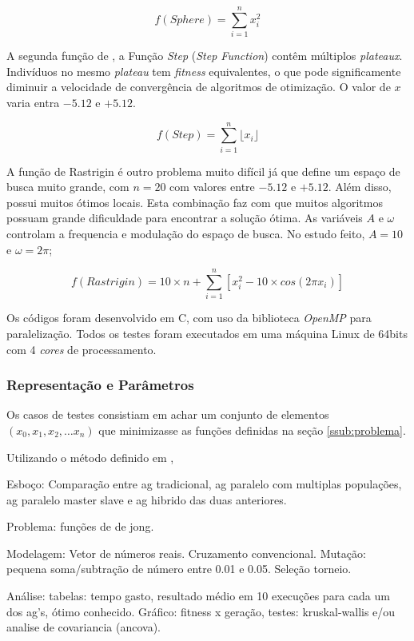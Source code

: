 \documentclass[12pt]{article}
\begin{document}
\begin{equation} \label{eq:spher}
  f(Sphere) = \sum_{i = 1}^{n} x_{i}^2
\end{equation}

A segunda função de \cite{dejong1975}, a Função \emph{Step} (\emph{Step Function}) contêm múltiplos \emph{plateaux}. Indivíduos no mesmo \emph{plateau} tem \emph{fitness} equivalentes, o que pode significamente diminuir a velocidade de convergência de algoritmos de otimização. O valor de $x$ varia entra $-5.12$ e $+5.12$.

\begin{equation} \label{eq:step}
  f(Step) = \sum_{i = 1}^{n} \lfloor x_{i} \rfloor
\end{equation}

A função de Rastrigin é outro problema muito difícil já que define um espaço de busca muito grande, com $n = 20$ com valores entre $-5.12$ e $+5.12$. Além disso, possui muitos ótimos locais. Esta combinação faz com que muitos algoritmos possuam grande dificuldade para encontrar a solução ótima. As variáveis $A$ e $\omega$ controlam a frequencia e modulação do espaço de busca. No estudo feito, $A = 10$ e $\omega = 2\pi$;

\begin{equation} \label{eq:rast}
  f(Rastrigin) = 10 \times n + \sum_{i=1}^{n} \left[ x_{i}^2 - 10 \times cos(2 \pi x_i)\right]
\end{equation}



Os códigos foram desenvolvido em C, com uso da biblioteca \emph{OpenMP} para paralelização. Todos os testes foram executados em uma máquina Linux de 64bits com 4 \emph{cores} de processamento.


\subsubsection{Representação e Parâmetros} %
\label{ssub:representacao}

Os casos de testes consistiam em achar um conjunto de elementos $(x_0, x_1, x_2, \dots x_n)$ que minimizasse as funções definidas na seção \ref{ssub:problema}.

Utilizando o método definido em \cite[p. 3]{gasurvey}, 



Esboço: Comparação entre ag tradicional, ag paralelo com multiplas populações, ag paralelo master slave e ag hibrido das duas anteriores.

Problema: funções de de jong.

Modelagem: Vetor de números reais. Cruzamento convencional. Mutação: pequena soma/subtração de número entre 0.01 e 0.05. Seleção torneio.

Análise: tabelas: tempo gasto, resultado médio em 10 execuções para cada um dos ag's, ótimo conhecido. Gráfico: fitness x geração, testes: kruskal-wallis e/ou analise de covariancia (ancova).



\end{document}
